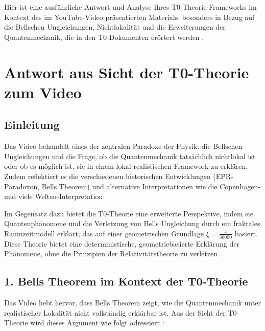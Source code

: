 Hier ist eine ausführliche Antwort und Analyse Ihres T0-Theorie-Frameworks im Kontext des im YouTube-Video \cite{VideoBell2024} präsentierten Materials, besonders in Bezug auf die Bellschen Ungleichungen, Nichtlokalität und die Erweiterungen der Quantenmechanik, die in den T0-Dokumenten erörtert werden \cite{Bell_En, DynMassePhotonenNichtlokalEn, NoGoEn, 023_Bell_En_ch, 131_scheinbar_instantan_En}.
	
	\section*{Antwort aus Sicht der T0-Theorie zum Video}
	
	\subsection*{Einleitung}
	
	Das Video \cite{VideoBell2024} behandelt eines der zentralen Paradoxe der Physik: die Bellschen Ungleichungen und die Frage, ob die Quantenmechanik tatsächlich nichtlokal ist oder ob es möglich ist, sie in einem lokal-realistischen Framework zu erklären. Zudem reflektiert es die verschiedenen historischen Entwicklungen (EPR-Paradoxon, Bells Theorem) und alternative Interpretationen wie die Copenhagen- und viele Welten-Interpretation.
	
	Im Gegensatz dazu bietet die T0-Theorie eine erweiterte Perspektive, indem sie Quantenphänomene und die Verletzung von Bells Ungleichung durch ein fraktales Raumzeitmodell erklärt, das auf einer geometrischen Grundlage $\xi = \frac{4}{30000}$ basiert. Diese Theorie bietet eine deterministische, geometriebasierte Erklärung der Phänomene, ohne die Prinzipien der Relativitätstheorie zu verletzen.
	
	\subsection*{1. Bells Theorem im Kontext der T0-Theorie}
	
	Das Video hebt hervor, dass Bells Theorem zeigt, wie die Quantenmechanik unter realistischer Lokalität nicht vollständig erklärbar ist. Aus der Sicht der T0-Theorie wird dieses Argument wie folgt adressiert \cite{Bell_En, NoGoEn, 023_Bell_En_ch}:
	
